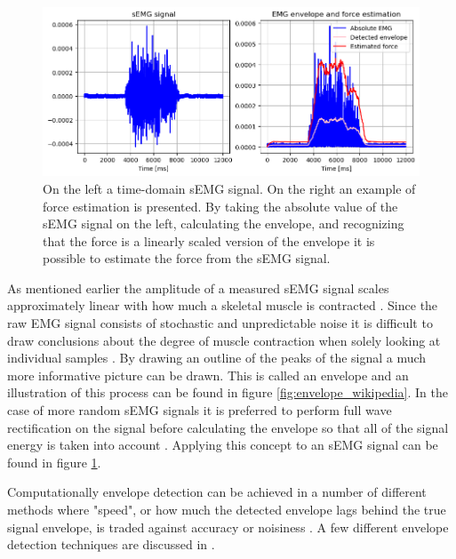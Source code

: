 \begin{figure}[h!t]
	\begin{center}
		\includegraphics[width=1.0\columnwidth]{images/amplitude_force_estimation_example.png}
	\end{center}
	\caption{On the left a time-domain sEMG signal. On the right an example of force estimation is presented. By taking the absolute value of the sEMG signal on the left, calculating the envelope, and recognizing that the force is a linearly scaled version of the envelope it is possible to estimate the force from the sEMG signal.}
	\label{fig:amplitude_estimation_example}
\end{figure}

As mentioned earlier the amplitude of a measured sEMG signal scales approximately linear with how much a skeletal muscle is contracted \cite{adaptive_filter_dry_electrode}. Since the raw EMG signal consists of stochastic and unpredictable noise it is difficult to draw conclusions about the degree of muscle contraction when solely looking at individual samples \cite{semg_signals_analysis_and_applications}. By drawing an outline of the peaks of the signal a much more informative picture can be drawn. This is called an envelope and an illustration of this process can be found in figure \ref{fig:envelope_wikipedia}. In the case of more random sEMG signals it is preferred to perform full wave rectification on the signal before calculating the envelope so that all of the signal energy is taken into account \cite{semg_signals_analysis_and_applications}. Applying this concept to an sEMG signal can be found in figure \ref{fig:amplitude_estimation_example}.

Computationally envelope detection can be achieved in a number of different methods where "speed", or how much the detected envelope lags behind the true signal envelope, is traded against accuracy or noisiness \cite{dsp_good_bad_ugly}. A few different envelope detection techniques are discussed in \cite{rose2011electromyogram}.

